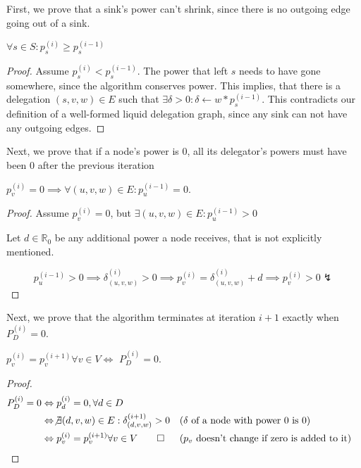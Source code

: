 First, we prove that a sink's power can't shrink, since there is no outgoing edge going out of a sink.

\begin{lemma}\label{lem:sink_non_shrink}
$\forall s \in S: p_s^{(i)} \ge p_s^{(i-1)}$ 
\end{lemma}
\begin{proof}
Assume $p_s^{(i)} < p_s^{(i-1)}$. The power that left $s$ needs to have gone somewhere, since the algorithm conserves power. This implies, that there is a delegation $(s, v, w) \in E$ such that $\exists \delta > 0: \delta \gets w * p_s^{(i-1)}$. This contradicts our definition of a well-formed liquid delegation graph, since any sink can not have any outgoing edges.
\end{proof}

Next, we prove that if a node's power is 0, all its delegator's powers must have been 0 after the previous iteration
\begin{lemma}\label{lem:simple_iterative_empty_node}
$p_v^{(i)} = 0 \implies \forall (u, v, w) \in E: p_u^{(i - 1)} = 0$. 
\end{lemma}
\begin{proof} Assume $p_v^{(i)} = 0$, but $\exists (u, v, w) \in E: p_u^{(i-1)} > 0$

Let $d \in \mathbb{R}_{0}$ be any additional power a node receives, that is not explicitly mentioned.

\[
p_u^{(i-1)} > 0 \implies \delta_{(u, v, w)}^{(i)} > 0 \implies p_v^{(i)} = \delta_{(u, v, w)}^{(i)} + d \implies p_v^{(i)} > 0 \lightning
\]

\end{proof}

Next, we prove that the algorithm terminates at iteration $i+1$ exactly when $P_D^{(i)} = 0$.

\begin{lemma}\label{lem:simple_alg_terminates}
 $p_v^{(i)} = p_v^{(i+1)} \forall v \in V \Leftrightarrow$ $P_D^{(i)} = 0$.
\end{lemma}
\begin{proof}

\begin{align*}
	P_D^{(i)} = 0 
	&\Leftrightarrow p_d^{(i)} = 0, \forall d \in D \\
	&\Leftrightarrow \not\exists (d, v, w) \in E: \delta_{(d, v, w)}^{(i+1)} > 0  &&\text{($\delta$ of a node with power 0 is 0)}\\
	&\Leftrightarrow p_v^{(i)} = p_v^{(i+1)} \forall v \in V \qed  &&\text{($p_v$ doesn't change if zero is added to it)}
\end{align*}
\end{proof}

